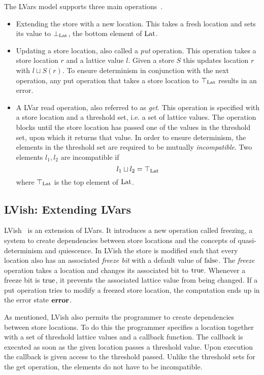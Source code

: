The LVars model supports three main operations~\parencite{kuper2013lvars}.
\begin{itemize}
  \item Extending the store with a new location. This takes a fresh location and
    sets its value to $\bot_{\mathrm{Lat}}$, the bottom element of $\mathrm{Lat}$.
  \item Updating a store location, also called a \emph{put} operation. This
    operation takes a store location $r$ and a lattice value $l$. Given a store
    $S$ this updates location $r$ with $l \sqcup S(r)$. To ensure determinism in
    conjunction with the next operation, any put operation that takes a store
    location to $\top_{\mathrm{Lat}}$ results in an error.
  \item A LVar read operation, also referred to as \emph{get}. This operation is
    specified with a store location and a threshold set, i.e. a set of lattice
    values. The operation blocks until the store location has passed one of the
    values in the threshold set, upon which it returns that value. In order to
    ensure determinism, the elements in the threshold set are required to be
    mutually \emph{incompatible}. Two elements $l_1, l_2$ are incompatible if
    \begin{equation*}
      l_1 \sqcup l_2 = \top_{\mathrm{Lat}}
    \end{equation*}
    where $\top_{\mathrm{Lat}}$ is the top element of $\mathrm{Lat}$.
\end{itemize}

\subsection{LVish: Extending LVars}%
\label{sub:lvish_extending_lvars}

LVish~\parencite{kuper2014freeze} is an extension of LVars. It introduces a new
operation called freezing, a system to create dependencies between store
locations and the concepts of quasi-determinism and quiescence.  In LVish the
store is modified such that every location also has an associated \emph{freeze
bit} with a default value of $\mathrm{false}$. The \emph{freeze} operation
takes a location and changes its associated bit to $\mathrm{true}$.  Whenever a
freeze bit is $\mathrm{true}$, it prevents the associated lattice value from being
changed. If a put operation tries to modify a freezed store location, the
computation ends up in the error state $\mbox{{\bf error}}$.

As mentioned, LVish also permits the programmer to create dependencies between
store locations. To do this the programmer specifies a location together with a
set of threshold lattice values and a callback function. The callback is
executed as soon as the given location passes a threshold value. Upon execution
the callback is given access to the threshold passed. Unlike the threshold sets
for the get operation, the elements do not have to be incompatible. 


